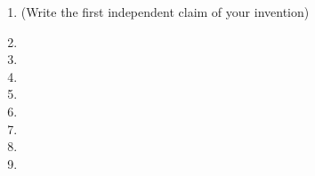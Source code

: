 \begin{enumerate}[leftmargin=*]




	\item 
			(Write the first independent claim of your invention)
	
	
	
	
	\item 
			
	
	
	
		
	\item 
	
	
	
	
	
			
	\item 

	
	
	
	
		
	\item
	
	
	
	
	
	
	\item 

	
	
	
		
	\item

	
	
	
	
			
	\item

	
	
	
	
			
	\item


\end{enumerate}
